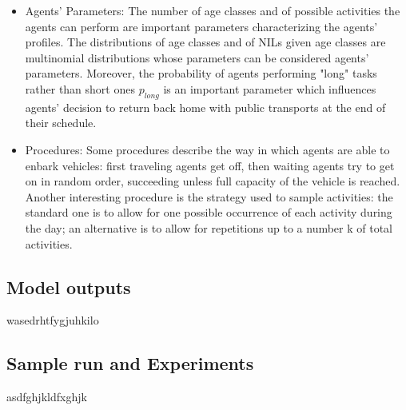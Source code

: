 \begin{itemize}
\item Agents' Parameters: The number of age classes and of possible activities the agents can perform are important parameters characterizing the agents' profiles. The distributions of age classes and of NILs given age classes are multinomial distributions whose parameters can be considered agents' parameters. Moreover, the probability of agents performing "long" tasks rather than short ones $p_{long}$ is an important parameter which influences agents' decision to return back home with public transports at the end of their schedule.
\item Procedures: Some procedures describe the way in which agents are able to enbark vehicles: first traveling agents get off, then waiting agents try to get on in random order, succeeding unless full capacity of the vehicle is reached. Another interesting procedure is the strategy used to sample activities: the standard one is to allow for one possible occurrence of each activity during the day; an alternative is to allow for repetitions up to a number k of total activities. 
\end{itemize}


\subsection{Model outputs}
wasedrhtfygjuhkilo

\subsection{Sample run and Experiments}
asdfghjkldfxghjk